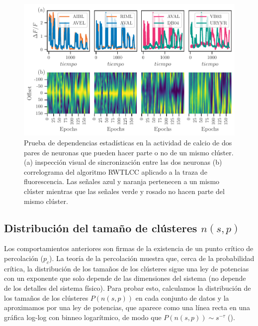 \begin{figure}[h!]
	\centering\includegraphics[width=\imsize]{correlaciones_clusteres.pdf}
	\caption[Prueba de dependencias estadísticas en la actividad de calcio de dos pares de neuronas que pueden hacer parte o no de un mismo clúster.]{Prueba de dependencias estadísticas en la actividad de calcio de dos pares de neuronas que pueden hacer parte o no de un mismo clúster.   (a)  inspección visual de sincronización entre las dos neuronas (b)   correlograma del algoritmo  RWTLCC aplicado a la  traza de fluorescencia.  Las señales azul y naranja pertenecen a un mismo clúster mientras que las señales verde y rosado no hacen parte del mismo clúster.  } \label{fig:correlaciones_clusteres}
\end{figure}





\subsection{Distribución del tamaño de clústeres $n(s,p)$}\label{sec:distribucion_tamaño}


Los comportamientos anteriores son firmas de la existencia de un punto crítico de percolación ($p_c$). La teoría de la percolación muestra que, cerca de la probabilidad crítica, la distribución de los tamaños de los clústeres sigue una ley de potencias con un exponente que solo depende de las dimensiones del sistema (no depende de los detalles del sistema físico). Para probar esto, calculamos la distribución de los tamaños de los clústeres $P(n(s,p))$ en cada conjunto de datos y la aproximamos por una ley de potencias, que aparece como una línea recta en una gráfica log-log con binneo logarítmico, de modo que $P(n(s,p)) \sim s^{-\tau}$ ().


